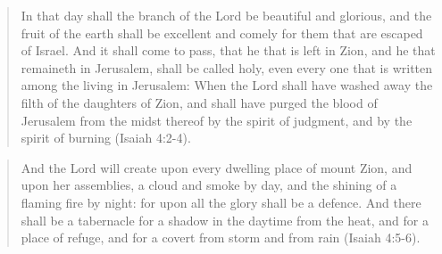 \begin{quotation}
In that day shall the branch of the Lord be beautiful and glorious, and the fruit of the earth shall be excellent and comely for them that are escaped of Israel. And it shall come to pass, that he that is left in Zion, and he that remaineth in Jerusalem, shall be called holy, even every one that is written among the living in Jerusalem: When the Lord shall have washed away the filth of the daughters of Zion, and shall have purged the blood of Jerusalem from the midst thereof by the spirit of judgment, and by the spirit of burning (Isaiah 4:2-4).
\end{quotation}

\begin{quotation}
And the Lord will create upon every dwelling place of mount Zion, and upon her assemblies, a cloud and smoke by day, and the shining of a flaming fire by night: for upon all the glory shall be a defence. And there shall be a tabernacle for a shadow in the daytime from the heat, and for a place of refuge, and for a covert from storm and from rain (Isaiah 4:5-6).
\end{quotation}

